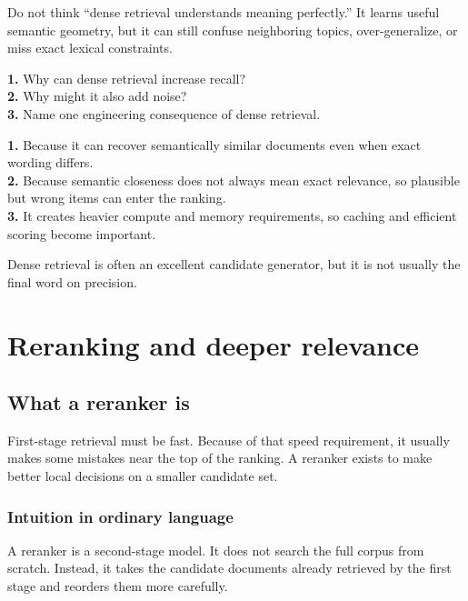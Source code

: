 \documentclass[11pt,oneside]{report}
\begin{document}
\begin{warningbox}
Do not think ``dense retrieval understands meaning perfectly.'' It learns useful semantic geometry, but it can still confuse neighboring topics, over-generalize, or miss exact lexical constraints.
\end{warningbox}

\begin{selfcheckbox}
\textbf{1.} Why can dense retrieval increase recall?\\
\textbf{2.} Why might it also add noise?\\
\textbf{3.} Name one engineering consequence of dense retrieval.
\end{selfcheckbox}

\begin{answerbox}
\textbf{1.} Because it can recover semantically similar documents even when exact wording differs.\\
\textbf{2.} Because semantic closeness does not always mean exact relevance, so plausible but wrong items can enter the ranking.\\
\textbf{3.} It creates heavier compute and memory requirements, so caching and efficient scoring become important.
\end{answerbox}

\begin{rememberbox}
Dense retrieval is often an excellent candidate generator, but it is not usually the final word on precision.
\end{rememberbox}


\part[Reranking]{Reranking and deeper relevance}
\chapter[What a Reranker Is]{What a reranker is}

\begin{purposebox}
First-stage retrieval must be fast. Because of that speed requirement, it usually makes some mistakes near the top of the ranking. A reranker exists to make better local decisions on a smaller candidate set.
\end{purposebox}

\section*{Intuition in ordinary language}
A reranker is a second-stage model. It does not search the full corpus from scratch. Instead, it takes the candidate documents already retrieved by the first stage and reorders them more carefully.
\end{document}
